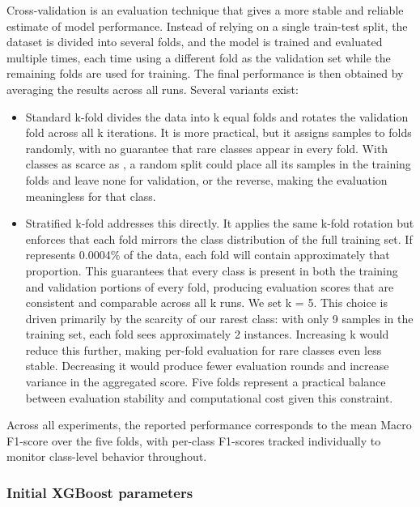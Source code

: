 Cross-validation is an evaluation technique that gives a more stable and reliable estimate of model performance. Instead of relying on a single train-test split, the dataset is divided into several folds, and the model is trained and evaluated multiple times, each time using a different fold as the validation set while the remaining folds are used for training. The final performance is then obtained by averaging the results across all runs. Several variants exist:

\begin{itemize}
    \item Standard k-fold divides the data into k equal folds and rotates the validation fold across all k iterations. It is more practical, but it assigns samples to folds randomly, with no guarantee that rare classes appear in every fold. With classes as scarce as , a random split could place all its samples in the training folds and leave none for validation, or the reverse, making the evaluation meaningless for that class.
    \item Stratified k-fold addresses this directly. It applies the same k-fold rotation but enforces that each fold mirrors the class distribution of the full training set. If  represents 0.0004\% of the data, each fold will contain approximately that proportion. This guarantees that every class is present in both the training and validation portions of every fold, producing evaluation scores that are consistent and comparable across all k runs. We set k = 5. This choice is driven primarily by the scarcity of our rarest class: with only 9  samples in the training set, each fold sees approximately 2 instances. Increasing k would reduce this further, making per-fold evaluation for rare classes even less stable. Decreasing it would produce fewer evaluation rounds and increase variance in the aggregated score. Five folds represent a practical balance between evaluation stability and computational cost given this constraint.
\end{itemize}
Across all experiments, the reported performance corresponds to the mean Macro F1-score over the five folds, with per-class F1-scores tracked individually to monitor class-level behavior throughout.

\subsubsection{Initial XGBoost parameters}


